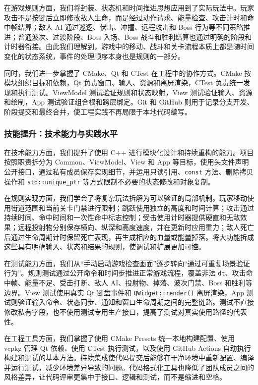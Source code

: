 \documentclass[a4paper]{article}
\begin{document}
在游戏规则方面，我们将封装、状态机和时间推进思想应用到了实际玩法中。玩家攻击不是按键后立即修改敌人生命，而是经过动作请求、能量检查、攻击计时和命中帧结算；敌人 AI 通过巡逻、伏击、冲撞、远程攻击和 Boss 行为等不同策略推进；普通波次、过渡阶段、Boss 入场、Boss 战斗和胜利结算也通过明确的阶段和计时器衔接。由此我们理解到，游戏中的移动、战斗和关卡流程本质上都是随时间变化的状态系统，事件的处理顺序本身也是规则的一部分。

同时，我们进一步掌握了 CMake、Qt 和 CTest 在工程中的协作方式。CMake 按模块组织目标和依赖，Qt 负责窗口、输入、资源和离屏渲染，CTest 负责统一发现和执行测试。ViewModel 测试验证规则和状态映射，View 测试验证输入、资源和绘制，App 测试验证组合根和跨层绑定。Git 和 GitHub 则用于记录分支开发、阶段提交和最终合并，使工程实践不再局限于本地代码编写。

\subsubsection{技能提升：技术能力与实践水平}

在技术能力方面，我们提升了使用 C++ 进行模块化设计和持续重构的能力。项目按照职责拆分为 Common、ViewModel、View 和 App 等目标，使用头文件声明公开接口，通过私有成员保存实现细节，并运用只读引用、\texttt{const} 方法、删除拷贝操作和 \texttt{std::unique\_ptr} 等方式限制不必要的状态修改和对象复制。

在规则实现方面，我们学会了将复杂玩法拆解为可以验证的局部机制。玩家移动使用街道范围和当前关卡门禁进行限制；跳跃使用独立的高度和时间计算；攻击通过持续时间、命中时间和一次性命中标志控制；受击使用计时器提供硬直和无敌效果；远程投射物分别保存横向、纵深和高度速度，并在更新时应用重力；敌人死亡后通过生命周期计时保留死亡表现，再生成相应的血量或能量掉落。将大功能拆成这些具有明确输入、状态和结果的规则，使调试和扩展更加可控。

在测试能力方面，我们从“手动启动游戏检查画面”逐步转向“通过可重复场景验证行为”。规则测试通过公开命令和时间步推进正常游戏流程，覆盖非法 \texttt{dt}、攻击命中帧、能量不足、受击打断、敌人 AI、投射物、掉落、波次门禁、Boss 和胜利等边界。View 测试使用真实 Qt 键盘事件和 \texttt{QWidget::render()} 离屏渲染，App 测试则验证输入命令、状态同步、通知和窗口生命周期之间的完整链路。测试不直接修改私有字段，也不使用测试专用生产接口，提高了测试对真实使用路径的代表性。

在工程工具方面，我们掌握了使用 CMake Presets 统一本地构建配置、使用 vcpkg 管理 Qt 依赖、使用 CTest 执行测试，以及使用 GitHub Actions 自动执行构建和测试的基本方法。持续集成使代码提交后能够在干净环境中重新配置、编译并运行测试，减少环境差异导致的问题。代码格式化工具也降低了团队成员之间的风格差异，让代码评审更集中于接口、逻辑和测试，而不是缩进和空格。
\end{document}

